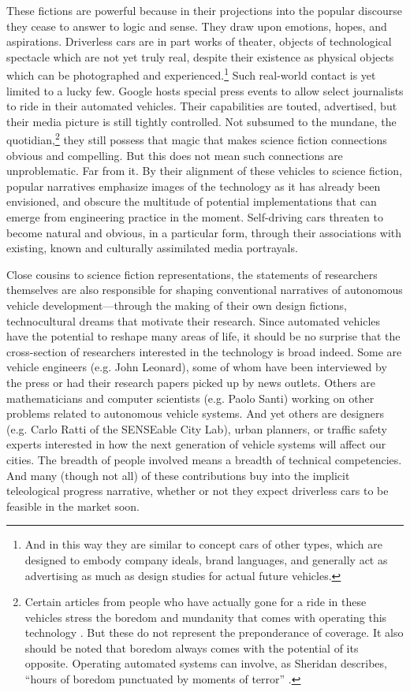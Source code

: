 These fictions are powerful because in their projections into the
popular discourse they cease to answer to logic and
sense. They draw upon emotions, hopes, and aspirations. Driverless cars
are in part works of theater, objects of technological spectacle which
are not yet truly real, despite their existence as physical objects
which can be photographed and experienced.\footnote{And in this way
  they are similar to concept cars of other types, which are designed
  to embody company ideals, brand languages, and generally act as
  advertising as much as design studies for actual future vehicles.}
Such real-world contact is 
yet limited to a lucky few. Google hosts special press events to allow
select journalists
to ride in their automated vehicles. Their capabilities are touted,
advertised, but their media picture is still tightly controlled. Not subsumed
to the mundane, the quotidian,\footnote{Certain articles from people
  who have actually gone for a ride in these vehicles stress the
  boredom and mundanity that comes with operating this
  technology \cite{rode500}. But these do not represent the
  preponderance of coverage. It also should be noted that boredom
  always comes with the potential of its opposite. Operating automated
systems can involve, as Sheridan describes, ``hours of boredom
punctuated by moments of terror'' \cite[p. 339]{sheridan}.} they still
possess that magic that 
makes science fiction connections obvious and compelling. But this
does not mean such connections are unproblematic. Far from it. By
their alignment of these vehicles to science fiction, popular
narratives emphasize images of the technology as it has already been
envisioned, and obscure the multitude of potential implementations
that can emerge from engineering practice in the moment. Self-driving
cars threaten to become natural and obvious, in a particular form,
through their associations with existing, known and culturally
assimilated media portrayals.

Close cousins to science fiction representations, the statements of
researchers themselves are also responsible for 
shaping conventional narratives of autonomous vehicle
development---through the making of their own design fictions,
technocultural dreams that motivate their research.
Since automated vehicles have the potential to reshape many areas of life, it should
be no surprise that the cross-section of researchers interested in the
technology is broad indeed. Some are vehicle engineers (e.g. John Leonard), some of whom have been
interviewed by the press or had their research papers picked up by news outlets.
Others are mathematicians and
computer scientists (e.g. Paolo Santi) working on other problems related to
autonomous vehicle systems. And yet others are designers (e.g. Carlo
Ratti of the SENSEable City Lab), urban
planners, or traffic safety experts interested in how the next
generation of vehicle systems will
affect our cities. The breadth of people involved means a breadth of
technical competencies. And many (though not all) of these contributions buy into the
implicit teleological progress narrative, whether or not they expect
driverless cars to be feasible in the market soon.

